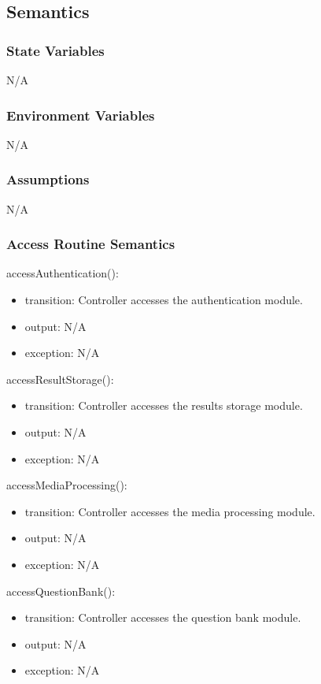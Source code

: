 \documentclass[12pt, titlepage]{article}
\begin{document}
\subsection{Semantics}

\subsubsection{State Variables}
N/A

\subsubsection{Environment Variables}
N/A

\subsubsection{Assumptions}
N/A

\subsubsection{Access Routine Semantics}

\noindent accessAuthentication():
\begin{itemize}
\item transition: Controller accesses the authentication module.
\item output: N/A
\item exception: N/A
\end{itemize}

\noindent accessResultStorage():
\begin{itemize}
\item transition: Controller accesses the results storage module.
\item output: N/A
\item exception: N/A
\end{itemize}

\noindent accessMediaProcessing():
\begin{itemize}
\item transition: Controller accesses the media processing module.
\item output: N/A
\item exception: N/A
\end{itemize}


\noindent accessQuestionBank():
\begin{itemize}
\item transition: Controller accesses the question bank module.
\item output: N/A
\item exception: N/A
\end{itemize}
\end{document}
